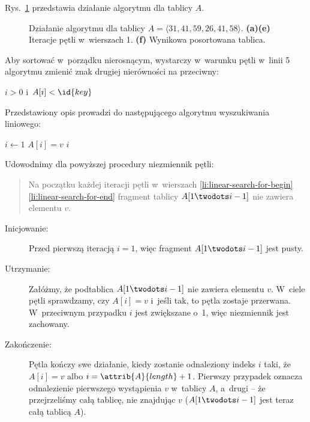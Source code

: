 
\exercise %
Rys.\ \ref{fig:2.1-1} przedstawia działanie algorytmu  dla tablicy $A$.
\begin{figure}[!ht]
	\centering 
	\caption{Działanie algorytmu  dla tablicy $A=\langle31,41,59,26,41,58\rangle$.
{\sffamily\bfseries(a)\nbendash(e)} Iteracje pętli  w~wierszach 1.
{\sffamily\bfseries(f)} Wynikowa posortowana tablica.} \label{fig:2.1-1}
\end{figure}

\exercise %
Aby sortować w~porządku nierosnącym, wystarczy w~warunku pętli  w~linii 5 algorytmu  zmienić znak drugiej nierówności na przeciwny:
\begin{codebox}
\setcounter{codelinenumber}{4}
\li	\While $i>0$ i~$A[i]<\id{key}$
\end{codebox}

\exercise %
Przedstawiony opis prowadzi do następującego algorytmu wyszukiwania liniowego:
\begin{codebox}
\li	\For $i\gets1$ \To {} \label{li:linear-search-for-begin}
\li		\Do \If $A[i]=v$
\li				\Then \Return $i$
				\End
		\End \label{li:linear-search-for-end}
\li	\Return {}
\end{codebox}

Udowodnimy dla powyższej procedury niezmiennik pętli:
\begin{quote}
Na początku każdej iteracji pętli  w~wierszach \ref{li:linear-search-for-begin}\nbendash\ref{li:linear-search-for-end} fragment tablicy $A[1\twodots i-1]$ nie zawiera elementu $v$.
\end{quote}
\begin{description}
	\item[Inicjowanie:] Przed pierwszą iteracją $i=1$, więc fragment $A[1\twodots i-1]$ jest pusty.
	\item[Utrzymanie:] Załóżmy, że podtablica $A[1\twodots i-1]$ nie zawiera elementu $v$.
W~ciele pętli  sprawdzamy, czy $A[i]=v$ i~jeśli tak, to pętla zostaje przerwana.
W~przeciwnym przypadku $i$ jest zwiększane o~1, więc niezmiennik jest zachowany.
	\item[Zakończenie:] Pętla kończy swe działanie, kiedy zostanie odnaleziony indeks $i$ taki, że $A[i]=v$ albo $i=\attrib{A}{length}+1$.
Pierwszy przypadek oznacza odnalezienie pierwszego wystąpienia $v$ w~tablicy $A$, a~drugi -- że przejrzeliśmy całą tablicę, nie znajdując $v$ ($A[1\twodots i-1]$ jest teraz całą tablicą $A$).
\end{description}

